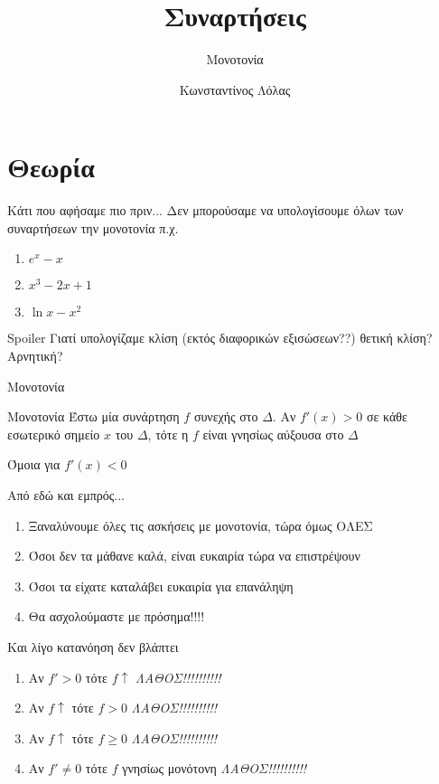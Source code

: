 \documentclass[greek]{beamer}
\title{Συναρτήσεις}
\subtitle{Μονοτονία}
\author[Λόλας]{Κωνσταντίνος Λόλας}
\date{}
\begin{document}
\begin{frame}
 \titlepage
\end{frame}

\section{Θεωρία}
\begin{frame}{Κάτι που αφήσαμε πιο πριν...}
 Δεν μπορούσαμε να υπολογίσουμε όλων των συναρτήσεων την μονοτονία π.χ.
 \begin{enumerate}
  \item $e^x-x$
  \item $x^3-2x+1$
  \item $\ln x - x^2$
 \end{enumerate}
\end{frame}

\begin{frame}{Spoiler}
 Γιατί υπολογίζαμε κλίση (εκτός διαφορικών εξισώσεων??)
  θετική κλίση? Αρνητική?
\end{frame}

\begin{frame}{Μονοτονία}
 \begin{block}{Μονοτονία}
  Έστω μία συνάρτηση $f$ συνεχής στο $Δ$. Αν $f'(x)>0$ σε κάθε εσωτερικό σημείο $x$ του $Δ$, τότε η $f$ είναι γνησίως αύξουσα στο $Δ$
 \end{block}
  Όμοια για $f'(x)<0$
\end{frame}

\begin{frame}{Από εδώ και εμπρός...}
 \begin{enumerate}
  \item<1-> Ξαναλύνουμε όλες τις ασκήσεις με μονοτονία, τώρα όμως ΟΛΕΣ
  \item<2-> Όσοι δεν τα μάθανε καλά, είναι ευκαιρία τώρα να επιστρέψουν
  \item<3-> Όσοι τα είχατε καταλάβει ευκαιρία για επανάληψη
  \item<4-> Θα ασχολούμαστε με πρόσημα!!!!
 \end{enumerate}
\end{frame}

\begin{frame}{Και λίγο κατανόηση δεν βλάπτει}
 \begin{enumerate}
   \item<1-> Αν $f'>0$ τότε $f\uparrow$  {\emph{ΛΑΘΟΣ!!!!!!!!!!}}
   \item<3-> Αν $f\uparrow$ τότε $f>0$  {\emph{ΛΑΘΟΣ!!!!!!!!!!}}
   \item<5-> Αν $f\uparrow$ τότε $f\ge 0$  {\emph{ΛΑΘΟΣ!!!!!!!!!!}}
   \item<7-> Αν $f'\ne 0$ τότε $f$ γνησίως μονότονη  {\emph{ΛΑΘΟΣ!!!!!!!!!!}}
 \end{enumerate}
\end{frame}
\end{document}
